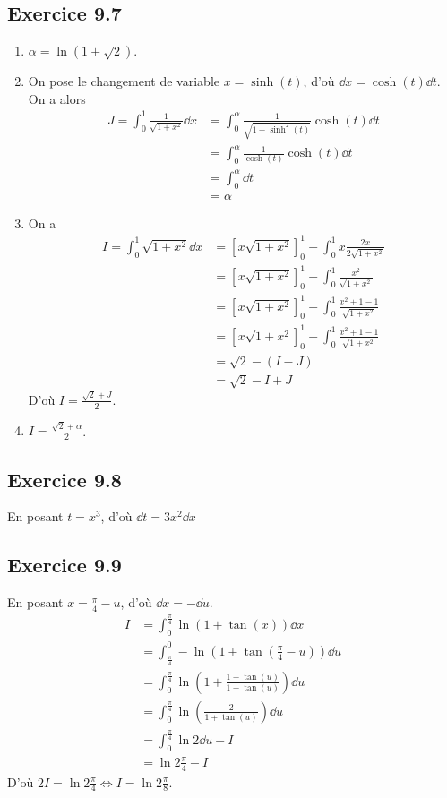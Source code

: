 \documentclass[7pt, twocolumn]{extarticle}
\def\Ssi{\Longleftrightarrow}
\begin{document}
  \subsection*{Exercice 9.7}
  \begin{enumerate}
    \item $\alpha = \ln(1+\sqrt{2})$.
    \item On pose le changement de variable $x=\sinh(t)$, d'où $\dd x=\cosh(t)\dd t$. On a alors 
    \begin{align*}
      J=\int_0^1\frac1{\sqrt{1+x^2}}\dd x &=\int_0^\alpha \frac1{\sqrt{1+\sinh^2(t)}}\cosh(t)\dd t\\
                                          &=\int_0^\alpha \frac1{\cosh(t)}\cosh(t)\dd t\\
                                          &=\int_0^\alpha \dd t\\
                                          &=\alpha
    \end{align*}
    \item On a 
    \begin{align*}
      I=\int_0^1\sqrt{1+x^2}\dd x &= [x\sqrt{1+x^2}]^1_0-\int_0^1x\frac{2x}{2\sqrt{1+x^2}}\\
                                  &= [x\sqrt{1+x^2}]^1_0-\int_0^1\frac{x^2}{\sqrt{1+x^2}}\\
                                  &= [x\sqrt{1+x^2}]^1_0-\int_0^1\frac{x^2+1-1}{\sqrt{1+x^2}}\\
                                  &= [x\sqrt{1+x^2}]^1_0-\int_0^1\frac{x^2+1-1}{\sqrt{1+x^2}}\\
                                  &= \sqrt2-(I-J)\\
                                  &= \sqrt2-I+J
    \end{align*}
    D'où $I=\frac{\sqrt2+J}2$.
    \item $I=\frac{\sqrt2+\alpha}2$.
  \end{enumerate}
  \subsection*{Exercice 9.8}
  En posant $t=x^3$, d'où $\dd t = 3x^2\dd x$
  \subsection*{Exercice 9.9}
  En posant $x=\frac\pi4 - u$, d'où $\dd x=-\dd u$. 
  \begin{align*}
    I &= \int_0^{\frac\pi4}\ln(1+\tan(x))\dd x\\
      &= \int_{\frac\pi4}^0-\ln(1+\tan(\frac\pi4-u))\dd u\\
      &= \int_0^{\frac\pi4}\ln(1+\frac{1-\tan(u)}{1+\tan(u)})\dd u\\
      &= \int_0^{\frac\pi4}\ln(\frac2{1+\tan(u)}) \dd u\\
      &= \int_0^{\frac\pi4} \ln2\dd u-I\\
      &= \ln2\frac\pi4 - I
  \end{align*}
  D'où $2I=\ln2\frac\pi4\Ssi I=\ln2\frac\pi8$.
\end{document}
